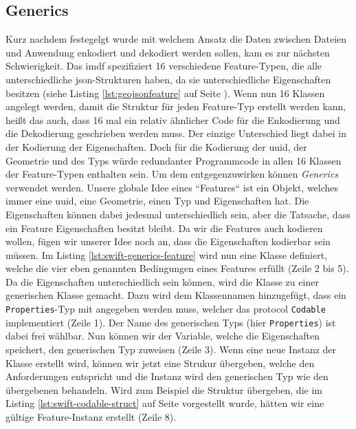 \subsection{Generics}
\label{subsec:generics}
Kurz nachdem festegelgt wurde mit welchem Ansatz die Daten zwischen Dateien und Anwendung enkodiert und dekodiert werden sollen, kam es zur nächsten Schwierigkeit.
Das \acl{imdf} spezifiziert 16 verschiedene Feature-Typen, die alle unterschiedliche \ac{json}-Strukturen haben, da sie unterschiedliche Eigenschaften besitzen (siehe Listing \ref{lst:geojsonfeature} auf Seite \pageref{lst:geojsonfeature}).
Wenn nun 16 Klassen angelegt werden, damit die Struktur für jeden Feature-Typ erstellt werden kann, heißt das auch, dass 16 mal ein relativ ähnlicher Code für die Enkodierung und die Dekodierung geschrieben werden muss.
Der einzige Unterschied liegt dabei in der Kodierung der Eigenschaften.
Doch für die Kodierung der \ac{uuid}, der Geometrie und des Typs würde redundanter Programmcode in allen 16 Klassen der Feature-Typen enthalten sein.
Um dem entgegenzuwirken können \emph{Generics} verwendet werden.\pbreak%
%
Unsere globale Idee eines ``Features`` ist ein Objekt, welches immer eine \ac{uuid}, eine Geometrie, einen Typ und Eigenschaften hat.
Die Eigenschaften können dabei jedesmal unterschiedlich sein, aber die Tatsache, dass ein Feature Eigenschaften besitzt bleibt.
Da wir die Features auch kodieren wollen, fügen wir unserer Idee noch an, dass die Eigenschaften kodierbar sein müssen.
Im Listing \ref{lst:swift-generics-feature} wird nun eine Klasse definiert, welche die vier eben genannten Bedingungen eines Features erfüllt (Zeile 2 bis 5).
Da die Eigenschaften unterschiedlich sein können, wird die Klasse zu einer generischen Klasse gemacht.
Dazu wird dem Klassennamen hinzugefügt, dass ein \texttt{Properties}-Typ mit angegeben werden muss, welcher das \Gls{protocol} \texttt{Codable} implementiert (Zeile 1).
Der Name des generischen Typs (hier \texttt{Properties}) ist dabei frei wählbar.
Nun können wir der Variable, welche die Eigenschaften speichert, den generischen Typ zuweisen (Zeile 3).\pbreak%
%
Wenn eine neue Instanz der Klasse erstellt wird, können wir jetzt eine Strukur übergeben, welche den Anforderungen entspricht und die Instanz wird den generischen Typ wie den übergebenen behandeln.
Wird zum Beispiel die Struktur übergeben, die im Listing \ref{lst:swift-codable-struct} auf Seite \pageref{lst:swift-codable-struct} vorgestellt wurde, hätten wir eine gültige Feature-Instanz erstellt (Zeile 8).
